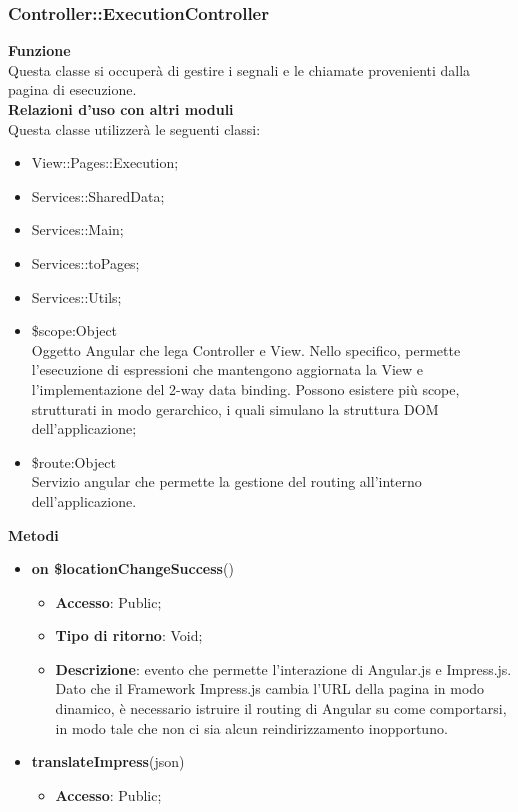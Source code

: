 {	\subsubsection{Controller::\-ExecutionController}{
		\textbf{Funzione}\\
		\indent Questa classe si occuperà di gestire i segnali e le chiamate provenienti dalla pagina di esecuzione.\\
		\textbf{Relazioni d'uso con altri moduli}\\
		\indent Questa classe utilizzerà le seguenti classi:
		\begin{itemize}
			\item View::\-Pages::\-Execution;
			\item Services::\-SharedData;
			\item Services::\-Main;
			\item Services::\-toPages;
			\item Services::\-Utils;
			\item \$scope:Object\\
				\indent Oggetto Angular che lega Controller e View. Nello specifico, permette l'esecuzione di espressioni che mantengono aggiornata la View e l'implementazione del 2-way data binding. Possono esistere più scope, strutturati in modo gerarchico, i quali simulano la struttura DOM dell'applicazione;
			\item \$route:Object\\
				\indent Servizio angular che permette la gestione del routing all'interno dell'applicazione.
		\end{itemize}
		\textbf{Metodi}
		\begin{itemize}
			\item \textbf{on \$locationChangeSuccess}()
			\begin{itemize}
				\item \textbf{Accesso}: Public;
				\item \textbf{Tipo di ritorno}: Void;
				\item \textbf{Descrizione}: evento che permette l'interazione di Angular.js e Impress.js. Dato che il Framework Impress.js cambia l'URL della pagina in modo dinamico, è necessario istruire il routing di Angular su come comportarsi, in modo tale che non ci sia alcun reindirizzamento inopportuno.
			\end{itemize}
			\item \textbf{translateImpress}(json)
			\begin{itemize}
				\item \textbf{Accesso}: Public;

\end{itemize}
\end{itemize}}}
